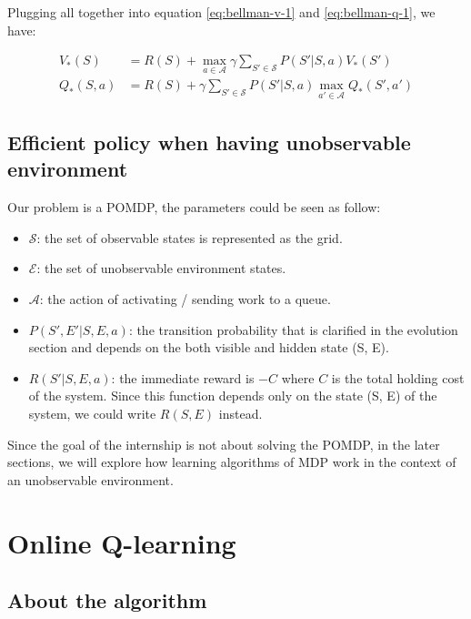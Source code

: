 \documentclass[
  a4paper, xcolor = usenames,dvipsnames]{article}
\providecommand{\tightlist}{%
  \setlength{\itemsep}{0pt}\setlength{\parskip}{0pt}}
\theoremstyle{definition}
\theoremstyle{definition}
\theoremstyle{definition}
\theoremstyle{definition}
\theoremstyle{remark}
\begin{document}
Plugging all together into equation \eqref{eq:bellman-v-1} and \eqref{eq:bellman-q-1}, we have:

\begin{align}
V_{*}(S) &= R(S) + \max_{a \in \mathcal{A}} \gamma \sum_{S' \in \mathcal{S}} P(S' | S, a) V_{*}(S')
\label{eq:bellman-max-v} \\
Q_{*}(S, a) &= R(S) + \gamma \sum_{S' \in \mathcal{S}} P(S' | S, a) \max_{a' \in \mathcal{A}} Q_{*}(S', a')
\label{eq:bellman-max-q}
\end{align}

\hypertarget{efficient-policy-when-having-unobservable-environment}{%
\subsection{Efficient policy when having unobservable environment}\label{efficient-policy-when-having-unobservable-environment}}

Our problem is a POMDP, the parameters could be seen as follow:

\begin{itemize}
\tightlist
\item
  \(\mathcal{S}\): the set of observable states is represented as the grid.
\item
  \(\mathcal{E}\): the set of unobservable environment states.
\item
  \(\mathcal{A}\): the action of activating / sending work to a queue.
\item
  \(P(S', E' | S, E, a)\): the transition probability that is clarified in the evolution section and depends on the both visible and hidden state (S, E).
\item
  \(R(S' | S, E, a)\): the immediate reward is \(-C\) where \(C\) is the total holding cost of the system. Since this function depends only on the state (S, E) of the system, we could write \(R(S, E)\) instead.
\end{itemize}

Since the goal of the internship is not about solving the POMDP, in the later sections, we will explore how learning algorithms of MDP work in the context of an unobservable environment.

\hypertarget{online-q-learning}{%
\section{Online Q-learning}\label{online-q-learning}}

\hypertarget{about-the-algorithm}{%
\subsection{About the algorithm}\label{about-the-algorithm}}
\end{document}
